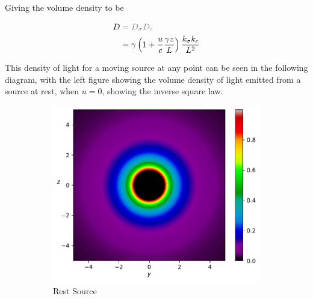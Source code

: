 Giving the volume density to be

\begin{equation}
	\begin{aligned}
		D & \color{gray} = D_{\sigma} D_{c}  \\
		  & = {\gamma}\left(1 + \dfrac{u}{c}\dfrac{\gamma z}{L}\right) \frac{k_{\sigma} k_{c}}{L^2}
	\end{aligned}
\end{equation}

This density of light for a moving source at any point can be seen in the following diagram, with the left figure showing the volume density of light emitted from a source at rest, when $u=0$, showing the inverse square law.



\begin{figure}[H]
	\centering
	\begin{subfigure}{0.45\textwidth}
		\centering
		\includegraphics[width=\textwidth]{images/pdf/Density_of_Light_from_Rest_Source.pdf}
		\caption{Rest Source}
		\label{subfig_1: Density of light for surface element}
	\end{subfigure}
	\begin{subfigure}{0.45\textwidth}
		\centering

\end{subfigure}
\end{figure}
